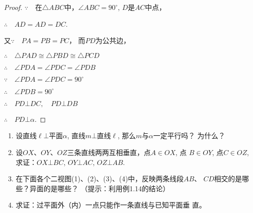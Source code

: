 \begin{figure}[htp]
  \centering
{}
  \caption{}
\end{figure}

\begin{proof}
$\because\quad $在$\triangle ABC$中，$\angle ABC=90^{\circ}$, $D$是$AC$中点，

$\therefore\quad AD=AD=DC$.

又$\because\quad PA=PB=PC$，
而$PD$为公共边，

$\therefore\quad \triangle PAD\cong \triangle PBD\cong \triangle PCD$

$\therefore\quad \angle PDA=\angle PDC=\angle PDB$

$\because\quad \angle PDA=\angle PDC=90^{\circ}$

$\therefore\quad \angle PDB=90^{\circ}$

$\therefore\quad PD\bot DC,\quad PD\bot DB$

$\therefore\quad PD\bot \alpha$.
\end{proof}

\begin{ex}
\begin{enumerate}
  \item 设直线$\ell\bot$平面$\alpha$, 直线$m\bot $直线$\ell$, 那么$m$与$\alpha$一定平行吗？
  为什么？
  \item 设$OX$、$OY$、$OZ$三条直线两两互相垂直，点$A\in OX$, 点
  $B\in OY$, 点$C\in OZ$, 求证：$OX\bot BC$, $OY\bot AC$, $OZ\bot 
  AB$.
  \item 在下面各个二视图(1)、(2)、(3)、(4)中，反映两条线段$AB$、
  $CD$相交的是哪些？异面的是哪些？
  （提示：利用例1.14的结论）
  \item 求证：过平面外（内）一点只能作一条直线与已知平面垂
  直。
\end{enumerate}
\end{ex}

